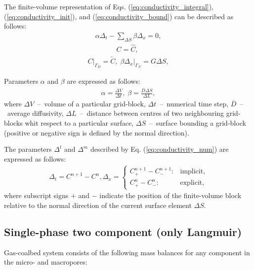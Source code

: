 \documentclass[a4paper,14pt,english]{extreport}
\begin{document}
The finite-volume representation of Eqs. (\ref{eq:conductivity_integral}), (\ref{eq:conductivity_init}), and (\ref{eq:conductivity_bound}) can be described as follows:
    \begin{eqnarray}
        \label{eq:conductivity_num}
        \alpha \Delta_{t} - \sum_{\Delta S} \beta\Delta_{x}= 0,
    \end{eqnarray}
    \begin{eqnarray}
         \label{eq:eq:conductivity_init_num}
        C = \hat{C}, \; 
    \end{eqnarray}
    \begin{eqnarray}
    \label{eq:eq:conductivity_bound_num}
      \label{eq:conductivity_bound_num}
    C \Big|_{\mathit{\Gamma}_D}= \tilde{C}, \; \beta\Delta_x \Big|_{\mathit{\Gamma}_N} = G\Delta S,
    \end{eqnarray}

Parameters $\alpha$ and $\beta$ are expressed as follows:
    \begin{eqnarray}
        \label{eq:alpha_beta}
        \alpha = \frac{\Delta V}{\Delta t}, \;
        \beta= \frac{\overline{D} \Delta S}{\Delta L},
    \end{eqnarray}
where $\Delta V$~--~volume of a particular grid-block, $\Delta t$~--~numerical time step, $\overline{D}$~--~average diffusivity, $\Delta L$~--~distance between centres of two neighbouring grid-blocks whit respect to a particular surface, $\Delta S$~--~surface bounding a grid-block (positive or negative sign is defined by the normal direction).

The parameters $\Delta^{t}$ and $\Delta^{m}$ described by Eq. (\ref{eq:conductivity_num}) are expressed as follows:
    \begin{eqnarray}
    \label{eq:delta_num}
    \Delta_t = C^{n+1} - C^{n}, \Delta_x = \begin{cases}
    C_{+}^{n+\mathit1} - C_{-}^{n+\mathit1} : &\text{implicit},\\
        C_{+}^{n} - C_{-}^{n} : &\text{explicit},
    \end{cases}
    \end{eqnarray}
where subscript signs $+$ and $-$ indicate the position of the finite-volume block relative to the normal direction of the current surface element $\Delta S$.

 \subsection*{Single-phase two component (only Langmuir)}
Gas-coalbed system consists of the following mass balances for any component in the micro- and macropores:
\end{document}
